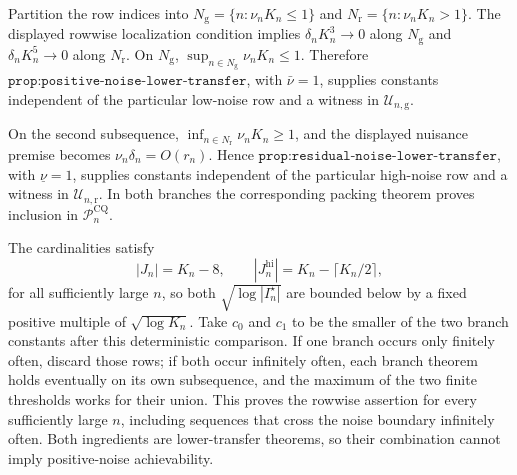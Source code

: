Partition the row indices into \(N_{\mathrm g}=\{n:\nu_nK_n\leq1\}\) and \(N_{\mathrm r}=\{n:\nu_nK_n>1\}\).  The displayed rowwise localization condition implies \(\delta_nK_n^3\to0\) along \(N_{\mathrm g}\) and \(\delta_nK_n^5\to0\) along \(N_{\mathrm r}\).  On \(N_{\mathrm g}\), \(\sup_{n\in N_{\mathrm g}}\nu_nK_n\leq1\).  Therefore \(\texttt{prop:positive-noise-lower-transfer}\), with \(\bar\nu=1\), supplies constants independent of the particular low-noise row and a witness in \(\mathcal U_{n,\mathrm g}\).

On the second subsequence, \(\inf_{n\in N_{\mathrm r}}\nu_nK_n\geq1\), and the displayed nuisance premise becomes \(\nu_n\delta_n=O(r_n)\).  Hence \(\texttt{prop:residual-noise-lower-transfer}\), with \(\underline\nu=1\), supplies constants independent of the particular high-noise row and a witness in \(\mathcal U_{n,\mathrm r}\).  In both branches the corresponding packing theorem proves inclusion in \(\mathcal P_n^{\mathrm{CQ}}\).

The cardinalities satisfy
\[
 |J_n|=K_n-8,\qquad |J_n^{\mathrm{hi}}|=K_n-\lceil K_n/2\rceil,
\]
for all sufficiently large \(n\), so both \(\sqrt{\log|I_n^\star|}\) are bounded below by a fixed positive multiple of \(\sqrt{\log K_n}\).  Take \(c_0\) and \(c_1\) to be the smaller of the two branch constants after this deterministic comparison.  If one branch occurs only finitely often, discard those rows; if both occur infinitely often, each branch theorem holds eventually on its own subsequence, and the maximum of the two finite thresholds works for their union.  This proves the rowwise assertion for every sufficiently large \(n\), including sequences that cross the noise boundary infinitely often.  Both ingredients are lower-transfer theorems, so their combination cannot imply positive-noise achievability.